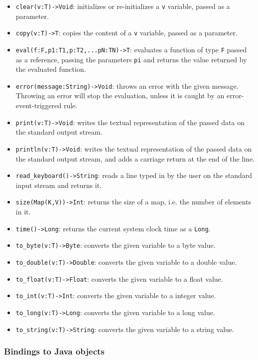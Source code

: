 \documentclass[11pt]{article}
\begin{document}
\begin{itemize}
\item \texttt{clear(v:T)->Void}: initializes or re-initializes a \texttt{v} variable, passed as a parameter.
\item \texttt{copy(v:T)->T}: copies the content of a \texttt{v} variable, passed as a parameter.
\item \texttt{eval(f:F,p1:T1,p:T2,...pN:TN)->T}: evaluates a function of type \texttt{F} passed as a reference, passing the parameters \texttt{pi} and returns the value returned by the evaluated function.
\item \texttt{error(message:String)->Void}: throws an error with the given message. Throwing an error will stop the evaluation, unless it is caught by an error-event-triggered rule.
\item \texttt{print(v:T)->Void}: writes the textual representation of the passed data on the standard output stream.
\item \texttt{println(v:T)->Void}: writes the textual representation of the passed data on the standard output stream, and adds a carriage return at the end of the line.
\item \texttt{read\_keyboard()->String}: reads a line typed in by the user on the standard input stream and returns it.
\item \texttt{size(Map(K,V))->Int}: returns the size of a map, i.e. the number of elements in it.
\item \texttt{time()->Long}: returns the current system clock time as a \texttt{Long}.
\item \texttt{to\_byte(v:T)->Byte}: converts the given variable to a byte value.
\item \texttt{to\_double(v:T)->Double}: converts the given variable to a double value.
\item \texttt{to\_float(v:T)->Float}: converts the given variable to a float value.
\item \texttt{to\_int(v:T)->Int}: converts the given variable to a integer value.
\item \texttt{to\_long(v:T)->Long}: converts the given variable to a long value.
\item \texttt{to\_string(v:T)->String}: converts the given variable to a string value.
\end{itemize}

\subsubsection{Bindings to Java objects\label{subsubsec:bindings}}
\end{document}
